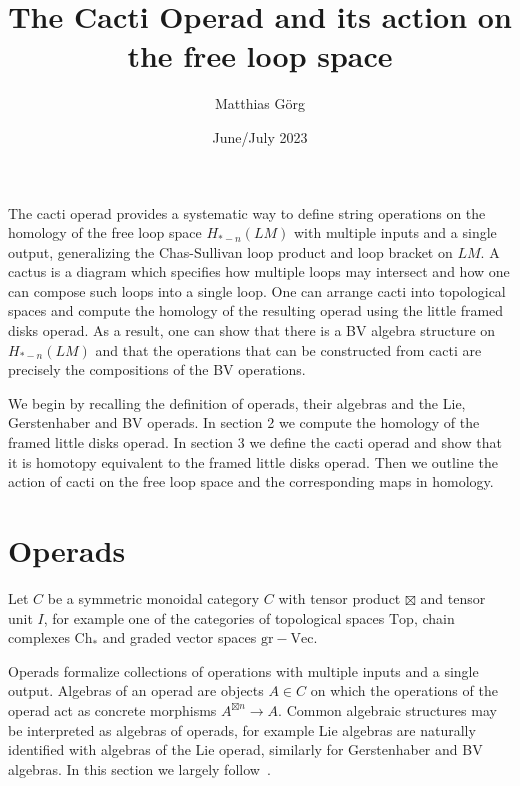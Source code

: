 \documentclass{scrartcl}
\title{The Cacti Operad and its action on the free loop space}
\date{June/July 2023}
\author{Matthias Görg}
\theoremstyle{plain}
\theoremstyle{definition}
\newcommand{\grVec}{\mathrm{gr{-}Vec}}
\begin{document}
\maketitle

The cacti operad provides a systematic way to define string operations on the homology of the free loop space $H_{*-n}(LM)$ with multiple inputs and a single output, generalizing the Chas-Sullivan loop product and loop bracket on $LM$. A cactus is a diagram which specifies how multiple loops may intersect and how one can compose such loops into a single loop. One can arrange cacti into topological spaces and compute the homology of the resulting operad using the little framed disks operad. As a result, one can show that there is a BV algebra structure on $H_{*-n}(LM)$ and that the operations that can be constructed from cacti are precisely the compositions of the BV operations. 

We begin by recalling the definition of operads, their algebras and the Lie, Gerstenhaber and BV operads. In section 2 we compute the homology of the framed little disks operad. In section 3 we define the cacti operad and show that it is homotopy equivalent to the framed little disks operad. Then we outline the action of cacti on the free loop space and the corresponding maps in homology.

\tableofcontents

\section{Operads}
Let $C$ be a symmetric monoidal category $C$ with tensor product $\boxtimes$ and tensor unit $I$, for example one of the categories of topological spaces $\mathrm{Top}$, chain complexes $\mathrm{Ch_*}$ and graded vector spaces $\grVec$.

Operads formalize collections of operations with multiple inputs and a single output. Algebras of an operad are objects $A\in C$ on which the operations of the operad act as concrete morphisms $A^{\boxtimes n} \to A$. Common algebraic structures may be interpreted as algebras of operads, for example Lie algebras are naturally identified with algebras of the Lie operad, similarly for Gerstenhaber and BV algebras. In this section we largely follow~\cite{Maz}. 
\end{document}

